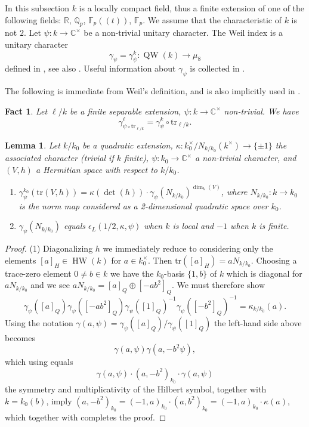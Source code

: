 \documentclass{article}
\def\R{\mathbb{R}}
\def\C{\mathbb{C}}
\def\Q{\mathbb{Q}}
\def\F{\mathbb{F}}
\newtheorem{lem}[thm]{Lemma}
\newtheorem{fct}[thm]{Fact}
\theoremstyle{definition}
\numberwithin{equation}{subsection}
\renewcommand{\-}{\hyp{}}
\DeclareMathOperator{\HW}{HW}
\DeclareMathOperator{\QW}{QW}
\begin{document}
\begin{appendices}
In this subsection $k$ is a locally compact field, thus a finite extension of one of the following fields: $\R$, $\Q_p$, $\F_p((t))$, $\F_p$. We assume that the characteristic of $k$ is not $2$. Let  $\psi : k \to \C^\times$ be a non-trivial unitary character. The Weil index is a unitary character
\[ \gamma_\psi = \gamma_\psi^k : \QW(k) \to \mu_8 \]
defined in \cite{Weil64}, see also \cite{Cartier64}. 
Useful information about $\gamma_\psi$ is collected in \cite[Appendix A]{RR93}.

	The following is immediate from Weil's definition, and is also implicitly used in \cite[\S30]{Weil64}.

	\begin{fct} \label{fct:gammaind}
    Let $\ell/k$ be a finite separable extension, $\psi : k \to \C^\times$ non-trivial. We have
    \[ \gamma^\ell_{\psi\circ \mathrm{tr}_{\ell/k}} = \gamma^k_\psi \circ \mathrm{tr}_{\ell/k}.\]
\end{fct}

\begin{lem} \label{lem:weilherm}
	Let $k/k_0$ be a quadratic extension, $\kappa : k_0^\times/N_{k/k_0}(k^\times) \to \{\pm1\}$ the associated character (trivial if $k$ finite), $\psi : k_0 \to \C^\times$ a non-trivial character, and $(V,h)$ a Hermitian space with respect to $k/k_0$.
	\begin{enumerate}
		\item $\gamma_\psi^{k_0}(\mathrm{tr}(V,h))=\kappa(\det(h))\cdot \gamma_\psi(N_{k/k_0})^{\dim_k(V)}$, where $N_{k/k_0} : k \to k_0$ is the norm map considered as a 2-dimensional quadratic space over $k_0$.
		\item $\gamma_\psi(N_{k/k_0})$ equals $\epsilon_L(1/2,\kappa,\psi)$ when $k$ is local and $-1$ when $k$ is finite.
	\end{enumerate}
\end{lem}
\begin{proof}
	(1) Diagonalizing $h$ we immediately reduce to considering only the elements $[a]_H \in \HW(k)$ for $a \in k_0^\times$. Then $\mathrm{tr}([a]_H)=aN_{k/k_0}$. Choosing a trace-zero element $0 \neq b \in k$ we have the $k_0$-basis $\{1,b\}$ of $k$ which is diagonal for $aN_{k/k_0}$ and we see $aN_{k/k_0}=[a]_Q \oplus [-ab^2]_Q$. We must therefore show
	    \[ \gamma_\psi([a]_Q)\gamma_\psi([-ab^2]_Q)\gamma_\psi([1]_Q)^{-1}\gamma_\psi([-b^2]_Q)^{-1}=\kappa_{k/k_0}(a). \]
    Using the notation $\gamma(a,\psi)=\gamma_\psi([a]_Q)/\gamma_\psi([1]_Q)$ the left-hand side above becomes
    \[ \gamma(a,\psi)\gamma(a,-b^2\psi), \]
    which using \cite[Corollary A.5(1)]{RR93} equals 
    \[ \gamma(a,\psi)\cdot (a,-b^2)_{k_0} \cdot \gamma(a,\psi) \]
    the symmetry and multiplicativity of the Hilbert symbol, together with $k=k_0(b)$, imply $(a,-b^2)_{k_0}=(-1,a)_{k_0}\cdot (a,b^2)_{k_0}=(-1,a)_{k_0} \cdot \kappa(a)$, which together with \cite[Corollary A.5(3)]{RR93} completes the proof.


\end{proof}
\end{appendices}
\end{document}
